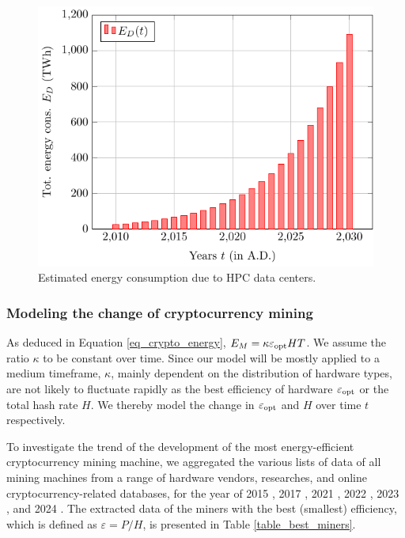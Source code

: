 \documentclass[12pt]{article}
\begin{document}
\begin{figure}[!t]
	\centering
	\caption{Estimated energy consumption due to HPC data centers.}
	\label{fig_energy_datacenter}
	\includegraphics{figures/trends/datacenter_energy.pdf}
\end{figure}

\subsubsection{Modeling the change of cryptocurrency mining}

As deduced in Equation \ref{eq_crypto_energy}, $E_M = \kappa \varepsilon_{\rm opt} HT$. We assume the ratio $\kappa$ to be constant over time. Since our model will be mostly applied to a medium timeframe, $\kappa$, mainly dependent on the distribution of hardware types, are not likely to fluctuate rapidly as the best efficiency of hardware $\varepsilon_{\rm opt}$ or the total hash rate $H$. We thereby model the change in $\varepsilon_{\rm opt}$ and $H$ over time $t$ respectively.

To investigate the trend of the development of the most energy-efficient cryptocurrency mining machine, we aggregated the various lists of data of all mining machines from a range of hardware vendors, researches, and online cryptocurrency-related databases, for the year of 2015 \citep{best_miner_2015}, 2017 \citep{btc_energy}, 2021 \citep{best_miner_2021}, 2022 \citep{best_miner_2022}, 2023 \citep{best_miner_2023}, and 2024 \citep{best_miner}. The extracted data of the miners with the best (smallest) efficiency, which is defined as $\varepsilon = P / H$, is presented in Table \ref{table_best_miners}.
\end{document}
